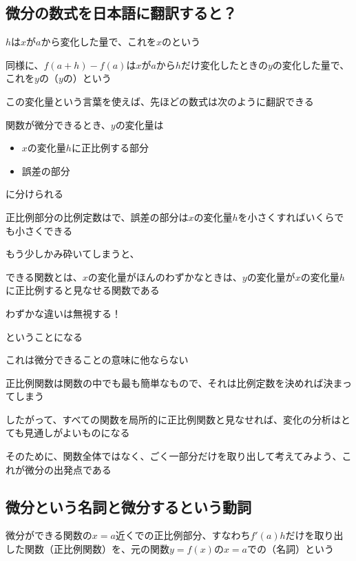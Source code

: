 \documentclass[../book_infinite_continuous_math]{subfiles}
\begin{document}
\sectionline
\subsection{微分の数式を日本語に翻訳すると？}

$h$は$x$が$a$から変化した量で、これを$x$のという

同様に、$f(a+h) - f(a)$は$x$が$a$から$h$だけ変化したときの$y$の変化した量で、これを$y$の（$y$の）という

この変化量という言葉を使えば、先ほどの数式は次のように翻訳できる

\begin{oframed}
  関数が微分できるとき、$y$の変化量は
  \begin{itemize}
    \item $x$の変化量$h$に正比例する部分
    \item 誤差の部分
  \end{itemize}
  に分けられる

  正比例部分の比例定数はで、誤差の部分は$x$の変化量$h$を小さくすればいくらでも小さくできる
\end{oframed}

もう少しかみ砕いてしまうと、

\begin{oframed}
  できる関数とは、$x$の変化量がほんのわずかなときは、$y$の変化量が$x$の変化量$h$に正比例すると見なせる関数である

  わずかな違いは無視する！
\end{oframed}

ということになる

これは微分できることの意味に他ならない

\br

正比例関数は関数の中でも最も簡単なもので、それは比例定数を決めれば決まってしまう

したがって、すべての関数を局所的に正比例関数と見なせれば、変化の分析はとても見通しがよいものになる

そのために、関数全体ではなく、ごく一部分だけを取り出して考えてみよう、これが微分の出発点である

\sectionline
\subsection{微分という名詞と微分するという動詞}

微分ができる関数の$x=a$近くでの正比例部分、すなわち$f'(a)h$だけを取り出した関数（正比例関数）を、元の関数$y=f(x)$の$x=a$での（名詞）という
\end{document}
